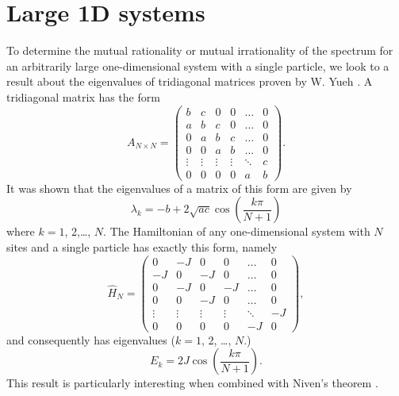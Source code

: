 \documentclass[a4paper,10pt]{article}
\theoremstyle{plain}
\begin{document}
\section{Large 1D systems}

To determine the mutual rationality or mutual irrationality of the spectrum for
an arbitrarily large one-dimensional system with a single particle, we look to a
result about the eigenvalues of tridiagonal matrices proven by W. Yueh
\cite{Yueh2006}. A tridiagonal matrix has the form
\begin{equation}
    A_{N \times N}
    =
    \begin{pmatrix}
             b &      c &     0  &      0 &  \dots & 0 \\
             a &      b &     c  &      0 &  \dots & 0 \\
             0 &      a &     b  &      c &  \dots & 0 \\
             0 &      0 &     a  &      b &  \dots & 0 \\
        \vdots & \vdots & \vdots & \vdots & \ddots & c \\
             0 &      0 &     0  &      0 &      a & b
    \end{pmatrix}.
\end{equation}
It was shown that the eigenvalues of a matrix of this form are given by
\begin{equation}
    \lambda_{k} = -b + 2 \sqrt{ac} \cos{\!\left( \frac{k \pi}{N+1} \right )}
\end{equation}
where $k=1$, 2,\dots, $N$. The Hamiltonian of any one-dimensional system with
$N$ sites and a single particle has exactly this form, namely
\begin{equation}
    \hat{H}_{N}
    =
    \begin{pmatrix}
         0 &     -J &     0  &      0 &  \dots &  0 \\
        -J &      0 &    -J  &      0 &  \dots &  0 \\
         0 &     -J &     0  &     -J &  \dots &  0 \\
         0 &      0 &    -J  &      0 &  \dots &  0 \\
    \vdots & \vdots & \vdots & \vdots & \ddots & -J \\
         0 &      0 &     0  &      0 &     -J &  0
    \end{pmatrix},
\end{equation}
and consequently has eigenvalues ($k=1$, 2, \dots, $N$.)
\begin{equation}
    \label{1D_eigenvalues}
    E_{k} = 2 J \cos{\!\left( \frac{k \pi}{N+1} \right)}.
\end{equation}
This result is particularly interesting when combined with Niven's theorem
\cite{DoubleIvan}.
\end{document}
